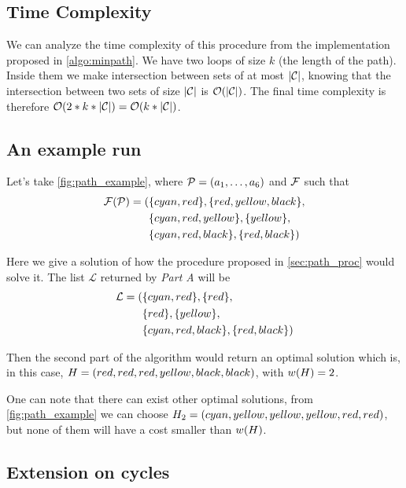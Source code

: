 \subsection{Time Complexity}

We can analyze the time complexity of this procedure from the implementation proposed in \cref{algo:minpath}. We have two loops of size $k$ (the length of the path). Inside them we make intersection between sets of at most $| \mathcal{C} |$, knowing that the intersection between two sets of size $| \mathcal{C} |$ is $\mathcal{O}(| \mathcal{C} |)$. The final time complexity is therefore $\mathcal{O}(2 * k * | \mathcal{C} |) = \mathcal{O}(k * | \mathcal{C} |)$.

\subsection{An example run}
\label{sec:path_ex_run}



Let's take \cref{fig:path_example}, where $\mathcal{P} = (a_1,\ldots,a_{6})$ and $\mathcal{F}$ such that
\begin{align*}
	\mathcal{F}(\mathcal{P}) = ( & \{cyan,red\}, \{red,yellow,black\},    \\
	                 & \{cyan,red,yellow\}, \{yellow\},    \\
	                 & \{cyan,red,black\}, \{red,black\}   )
\end{align*}

Here we give a solution of how the procedure proposed in \cref{sec:path_proc} would solve it. The list $\mathcal{L}$ returned by \textit{Part A} will be
\begin{align*}
	\mathcal{L} = ( & \{cyan,red\}, \{red\},      \\
	                & \{red\}, \{yellow\},        \\
	                & \{cyan,red,black\}, \{red,black\}   )
\end{align*}

Then the second part of the algorithm would return an optimal solution which is, in this case, $H = (red, red, red, yellow, black, black)$, with $w(H) = 2$.

One can note that there can exist other optimal solutions, from \cref{fig:path_example} we can choose $H_2 = (cyan, yellow, yellow, yellow, red, red)$, but none of them will have a cost smaller than $w(H)$.

\subsection{Extension on cycles}

